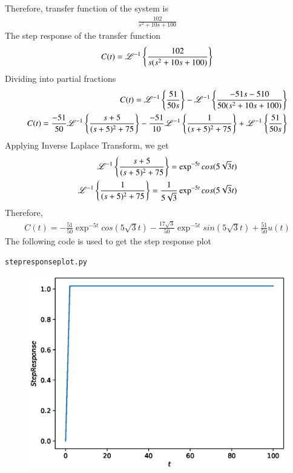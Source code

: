 \begin{enumerate}[label=\thesection.\arabic*.,ref=\thesection.\theenumi]
Therefore, transfer function of the system is
\begin{align}
    \frac{102}{s^2+10s+100}
\end{align}
The step response of the transfer function 
\begin{align}
    C(t)=\mathscr{L}^{-1}\left\{\frac{102}{s(s^2+10s+100)}\right\}
\end{align}
Dividing into partial fractions
\begin{align}
C(t)=\mathscr{L}^{-1}\left\{\frac{51}{50s}\right\}-\mathscr{L}^{-1}\left\{\frac{-51s-510}{50(s^2+10s+100)}\right\}
\\
C(t)=\frac{-51}{50}\mathscr{L}^{-1}\left\{\frac{s+5}{(s+5)^2+75}\right\}-\frac{-51}{10}\mathscr{L}^{-1}\left\{\frac{1}{(s+5)^2+75}\right\}+\mathscr{L}^{-1}\left\{\frac{51}{50s}\right\}
\end{align}
Applying Inverse Laplace Transform, we get
\begin{align}
\mathscr{L}^{-1}\left\{\frac{s+5}{(s+5)^2+75}\right\}=\exp^{-5t}cos(5\sqrt{3}t)
    \\
\mathscr{L}^{-1}\left\{\frac{1}{(s+5)^2+75}\right\}=\frac{1}{5\sqrt{3}}\exp^{-5t}cos(5\sqrt{3}t)
\end{align}
Therefore,
\begin{align}
C(t)=-\frac{51}{50}\exp^{-5t}cos(5\sqrt{3}t)-\frac{17\sqrt{3}}{50}\exp^{-5t}sin(5\sqrt{3}t)+\frac{51}{50}u(t)
\end{align}
The following code is used to get the step response plot
\begin{lstlisting}
stepresponseplot.py
\end{lstlisting}
\begin{figure}
\centering
\includegraphics[width=\columnwidth]{./plot.eps}
\caption{}
\label{fig:sec_order}
\end{figure}
\end{enumerate}
